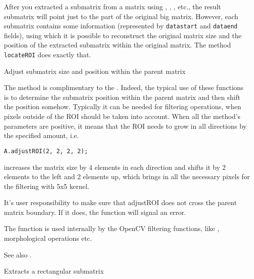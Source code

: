 After you extracted a submatrix from a matrix using , , ,  etc., the result submatrix will point just to the part of the original big matrix. However, each submatrix contains some information (represented by \texttt{datastart} and \texttt{dataend} fields), using which it is possible to reconstruct the original matrix size and the position of the extracted submatrix within the original matrix. The method \texttt{locateROI} does exactly that.

Adjust submatrix size and position within the parent matrix

\begin{description}
\end{description}

The method is complimentary to the . Indeed, the typical use of these functions is to determine the submatrix position within the parent matrix and then shift the position somehow. Typically it can be needed for filtering operations, when pixels outside of the ROI should be taken into account. When all the method's parameters are positive, it means that the ROI needs to grow in all directions by the specified amount, i.e.

\begin{lstlisting}
A.adjustROI(2, 2, 2, 2);
\end{lstlisting}

increases the matrix size by 4 elements in each direction and shifts it by 2 elements to the left and 2 elements up, which brings in all the necessary pixels for the filtering with 5x5 kernel.

It's user responsibility to make sure that adjustROI does not cross the parent matrix boundary. If it does, the function will signal an error.

The function is used internally by the OpenCV filtering functions, like , morphological operations etc.

See also .

Extracts a rectangular submatrix

